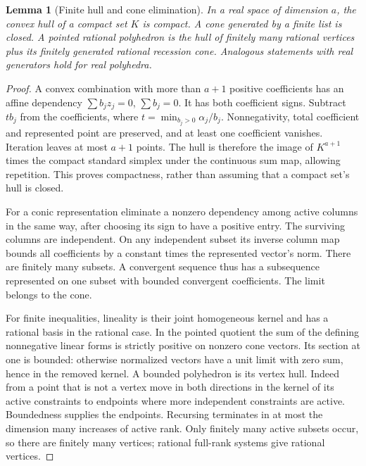 \documentclass[11pt]{article}
\newtheorem{lemma}[theorem]{Lemma}
\begin{document}
\begin{lemma}[Finite hull and cone elimination]\label{lem:hull}
In a real space of dimension $a$, the convex hull of a compact set $K$ is compact. A cone generated by a finite list is closed. A pointed rational polyhedron is the hull of finitely many rational vertices plus its finitely generated rational recession cone. Analogous statements with real generators hold for real polyhedra.
\end{lemma}
\begin{proof}
A convex combination with more than $a+1$ positive coefficients has an affine dependency $\sum b_jz_j=0$, $\sum b_j=0$. It has both coefficient signs. Subtract $t b_j$ from the coefficients, where $t=\min_{b_j>0}\alpha_j/b_j$. Nonnegativity, total coefficient and represented point are preserved, and at least one coefficient vanishes. Iteration leaves at most $a+1$ points. The hull is therefore the image of $K^{a+1}$ times the compact standard simplex under the continuous sum map, allowing repetition. This proves compactness, rather than assuming that a compact set's hull is closed.

For a conic representation eliminate a nonzero dependency among active columns in the same way, after choosing its sign to have a positive entry. The surviving columns are independent. On any independent subset its inverse column map bounds all coefficients by a constant times the represented vector's norm. There are finitely many subsets. A convergent sequence thus has a subsequence represented on one subset with bounded convergent coefficients. The limit belongs to the cone.

For finite inequalities, lineality is their joint homogeneous kernel and has a rational basis in the rational case. In the pointed quotient the sum of the defining nonnegative linear forms is strictly positive on nonzero cone vectors. Its section at one is bounded: otherwise normalized vectors have a unit limit with zero sum, hence in the removed kernel. A bounded polyhedron is its vertex hull. Indeed from a point that is not a vertex move in both directions in the kernel of its active constraints to endpoints where more independent constraints are active. Boundedness supplies the endpoints. Recursing terminates in at most the dimension many increases of active rank. Only finitely many active subsets occur, so there are finitely many vertices; rational full-rank systems give rational vertices.


\end{proof}
\end{document}
